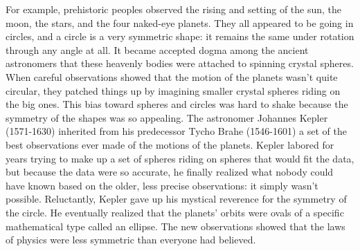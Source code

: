 For example, prehistoric peoples observed the rising and setting of the sun, the moon,
the stars, and the four naked-eye planets. They all appeared to be going in circles,
and a circle is a very symmetric shape: it remains the same under rotation through
any angle at all. It became accepted dogma among the ancient astronomers that these
heavenly bodies were attached to spinning crystal spheres. When careful observations
showed that the motion of the planets wasn't quite circular, they patched things up by imagining
smaller crystal spheres riding on the big ones. This bias toward spheres and circles
was hard to shake because the symmetry of the shapes was so appealing. The astronomer
Johannes Kepler (1571-1630) inherited from his predecessor Tycho Brahe (1546-1601)
a set of the best observations ever made of the motions of the planets. Kepler
labored for years trying to make up a set of spheres riding on spheres that would
fit the data, but because the data were so accurate, he finally realized what nobody
could have known based on the older, less precise observations: it simply wasn't
possible. Reluctantly, Kepler gave up his mystical reverence for the symmetry of the
circle. He eventually realized that the planets' orbits were ovals of a specific
mathematical type called an ellipse. The new observations showed that the laws of physics
were less symmetric than everyone had believed.

